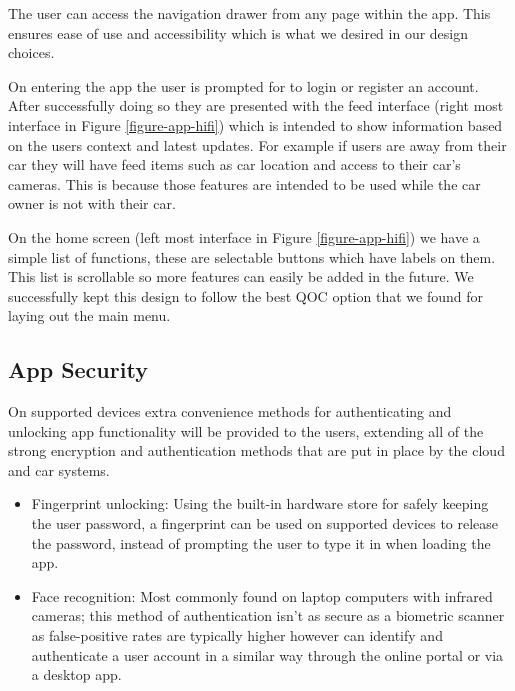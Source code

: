 \documentclass{article}
\begin{document}
The user can access the navigation drawer from any page within the app. This ensures ease of use and accessibility which is what we desired in our design choices.

On entering the app the user is prompted for to login or register an account. After successfully doing so they are presented with the feed interface (right most interface in Figure \ref{figure-app-hifi}) which is intended to show information based on the users context and latest updates. For example if users are away from their car they will have feed items such as car location and access to their car's cameras. This is because those features are intended to be used while the car owner is not with their car.

On the home screen (left most interface in Figure \ref{figure-app-hifi}) we have a simple list of functions, these are selectable buttons which have labels on them. This list is scrollable so more features can easily be added in the future. We successfully kept this design to follow the best QOC option that we found for laying out the main menu.




\subsection{App Security}\label{ssec:app-security}
On supported devices extra convenience methods for authenticating and unlocking app functionality will be provided to the users, extending all of the strong encryption and authentication methods that are put in place by the cloud and car systems.
\begin{itemize}
	\item Fingerprint unlocking: Using the built-in hardware store for safely keeping the user password, a fingerprint can be used on supported devices to release the password, instead of prompting the user to type it in when loading the app.
    \item Face recognition: Most commonly found on laptop computers with infrared cameras; this method of authentication isn't as secure as a biometric scanner as false-positive rates are typically higher however can identify and authenticate a user account in a similar way through the online portal or via a desktop app.
\end{itemize}

\end{document}
